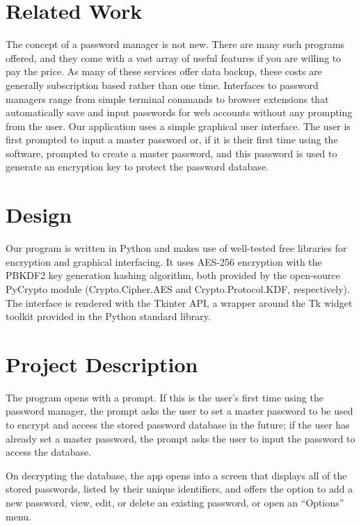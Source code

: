 \documentclass [oneside, letterpaper] {article}
\begin{document}
    \section {Related Work}
        The concept of a password manager is not new. There are many such
        programs offered, and they come with a vast array of useful features if
        you are willing to pay the price. As many of these services offer data
        backup, these costs are generally subscription based rather than one
        time. Interfaces to password managers range from simple terminal
        commands to browser extensions that automatically save and input
        passwords for web accounts without any prompting from the user. Our
        application uses a simple graphical user interface. The user is first
        prompted to input a master password or, if it is their first time using
        the software, prompted to create a master password, and this password is
        used to generate an encryption key to protect the password database.

    \section {Design}
        Our program is written in Python and makes use of well-tested free
        libraries for encryption and graphical interfacing. It uses AES-256
        encryption with the PBKDF2 key generation hashing algorithm, both
        provided by the open-source PyCrypto module (Crypto.Cipher.AES and
        Crypto.Protocol.KDF, respectively). The interface is rendered with
        the Tkinter API, a wrapper around the Tk widget toolkit provided in the
        Python standard library.

    \section {Project Description}
        The program opens with a prompt. If this is the user's first time using
        the password manager, the prompt asks the user to set a master password
        to be used to encrypt and access the stored password database in the
        future; if the user has already set a master password, the prompt asks
        the user to input the password to access the database.

        On decrypting the database, the app opens into a screen that displays
        all of the stored passwords, listed by their unique identifiers, and
        offers the option to add a new password, view, edit, or delete an
        existing password, or open an ``Options'' menu.
\end{document}
